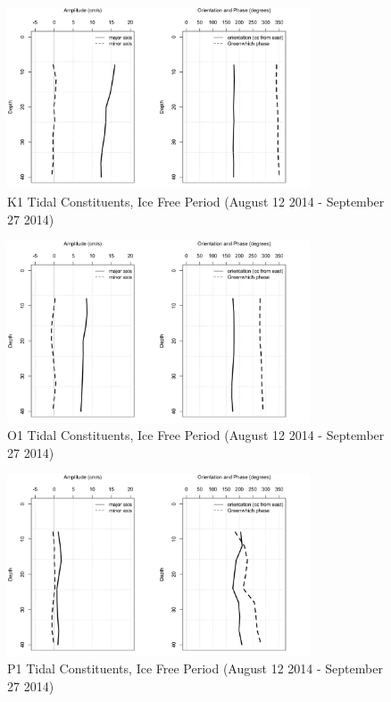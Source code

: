 \documentclass[12pt]{dforeport}
\begin{document}
\begin{figure}  
\centering
\includegraphics[width = 0.8\textwidth]{./figures/50_K1TC_if_2014.png}
\caption[K1 Tidal Constituents, Ice free, 2014]{K1 Tidal Constituents, Ice Free Period (August 12 2014 - September 27 2014)}
\label{f:k1_if_2014}
\end{figure}

\begin{figure}  
\centering
\includegraphics[width = 0.8\textwidth]{./figures/51_O1TC_if_2014.png}
\caption[O1 Tidal Constituents, Ice free, 2014]{O1 Tidal Constituents, Ice Free Period (August 12 2014 - September 27 2014)}
\label{f:o1_if_2014}
\end{figure}

\begin{figure}  
\centering
\includegraphics[width = 0.8\textwidth]{./figures/52_P1TC_if_2014.png}
\caption[P1 Tidal Constituents, Ice free, 2014]{P1 Tidal Constituents, Ice Free Period (August 12 2014 - September 27 2014)}
\label{f:p1_if_2014}
\end{figure}
\end{document}
